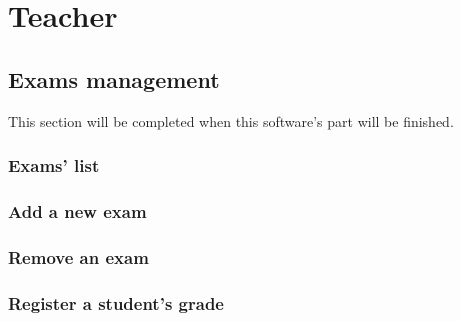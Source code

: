 \documentclass[ManualeUtente]{subfiles}
\begin{document}
\chapter{Teacher}
\section{Exams management}
This section will be completed when this software's part will be finished.
\subsection{Exams' list}
\subsection{Add a new exam}
\subsection{Remove an exam}
\subsection{Register a student's grade}
\end{document}
